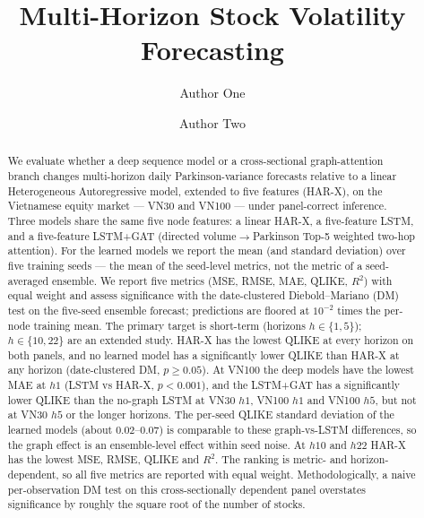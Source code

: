 \documentclass[runningheads]{llncs}
\begin{document}
\title{Multi-Horizon Stock Volatility Forecasting}

\author{Author One \and Author Two}

\maketitle

\begin{abstract}
We evaluate whether a deep sequence model or a cross-sectional graph-attention branch changes multi-horizon
daily Parkinson-variance forecasts relative to a linear Heterogeneous Autoregressive model, extended to five features (HAR-X), on the
Vietnamese equity market --- VN30 and VN100 --- under panel-correct inference.
Three models share the same five node features: a linear HAR-X, a
five-feature LSTM, and a five-feature LSTM+GAT (directed volume$\to$Parkinson Top-5 weighted two-hop
attention). For the learned models we report the mean (and standard deviation) over five training seeds ---
the mean of the seed-level metrics, not the metric of a seed-averaged ensemble. We report five metrics (MSE,
RMSE, MAE, QLIKE, $R^2$) with equal weight and assess significance with the date-clustered Diebold--Mariano
(DM) test on the five-seed ensemble forecast; predictions are floored at $10^{-2}$ times the per-node training
mean. The primary target is short-term (horizons $h\in\{1,5\}$); $h\in\{10,22\}$ are an extended study. HAR-X
has the lowest QLIKE at every horizon on both panels, and no learned model has a significantly lower QLIKE than
HAR-X at any horizon (date-clustered DM, $p\ge0.05$). At VN100 the deep models have the lowest MAE at $h1$
(LSTM vs HAR-X, $p<0.001$), and the LSTM+GAT has a significantly lower QLIKE than the no-graph LSTM at VN30
$h1$, VN100 $h1$ and VN100 $h5$, but not at VN30 $h5$ or the longer horizons. The per-seed QLIKE standard
deviation of the learned models (about $0.02$--$0.07$) is comparable to these graph-vs-LSTM differences, so the
graph effect is an ensemble-level effect within seed noise. At $h10$ and $h22$ HAR-X has the lowest MSE, RMSE,
QLIKE and $R^2$. The ranking is metric- and horizon-dependent, so all five metrics are reported with equal
weight. Methodologically, a naive per-observation DM test on this cross-sectionally dependent panel overstates
significance by roughly the square root of the number of stocks.

\end{abstract}
\end{document}
